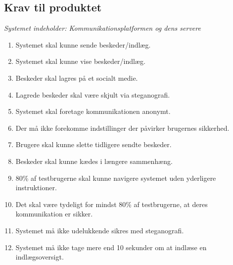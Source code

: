 \subsection{Krav til produktet}
\textit{Systemet indeholder: Kommunikationsplatformen og dens servere}
\begin{enumerate}[label=\textbf{Krav \arabic*},leftmargin=.80in]

    \item \label{k:send} Systemet skal kunne sende beskeder/indlæg.
    \item \label{k:vise} Systemet skal kunne vise beskeder/indlæg.
    \item \label{k:lagre} Beskeder skal lagres på et socialt medie.
    \item \label{k:stegano} Lagrede beskeder skal være skjult via steganografi.
    \item \label{k:anonymt} Systemet skal foretage kommunikationen anonymt.
    \item \label{k:indstil} Der må ikke forekomme indstillinger der påvirker brugernes sikkerhed.

    \item \label{k:slette} Brugere skal kunne slette tidligere sendte beskeder.
    \item \label{k:sammen} Beskeder skal kunne kædes i længere sammenhæng.
    \item \label{k:naviger} 80\% af testbrugerne skal kunne navigere systemet uden yderligere instruktioner.
    \item \label{k:sikker} Det skal være tydeligt for mindst 80\% af testbrugerne, at deres kommunikation er sikker.
    \item \label{k:krypto} Systemet må ikke udelukkende sikres med steganografi.
    \item \label{k:load} Systemet må ikke tage mere end 10 sekunder om at indlæse en indlægsoversigt.
\end{enumerate}